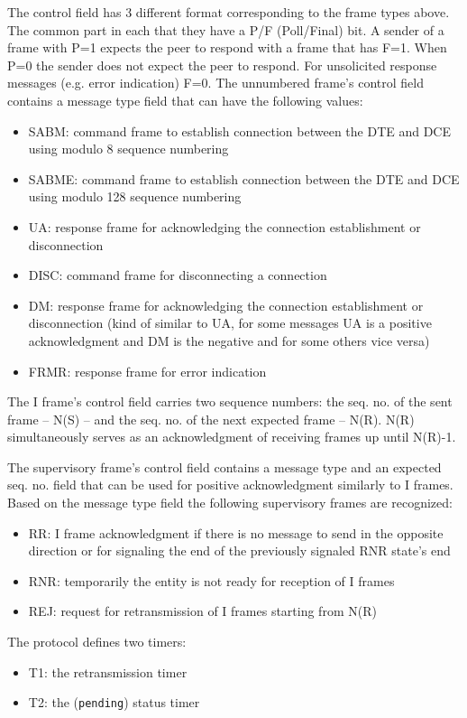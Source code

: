 \documentclass[a4paper]{article}
\begin{document}
The control field has 3 different format corresponding to the frame types above. The common part in each that they have a P/F (Poll/Final) bit. A sender of a frame with P=1 expects the peer to respond with a frame that has F=1. When P=0 the sender does not expect the peer to respond. For unsolicited response messages (e.g. error indication) F=0.
The unnumbered frame's control field contains a message type field that can have the following values:
\begin{itemize}
\item SABM: command frame to establish connection between the DTE and DCE using modulo 8 sequence numbering
\item SABME: command frame to establish connection between the DTE and DCE using modulo 128 sequence numbering
\item UA: response frame for acknowledging the connection establishment or disconnection
\item DISC: command frame for disconnecting a connection
\item DM: response frame for acknowledging the connection establishment or disconnection
  (kind of similar to UA, for some messages UA is a positive acknowledgment and DM is the negative and for some others vice versa)
\item FRMR: response frame for error indication
\end{itemize}

The I frame's control field carries two sequence numbers: the seq. no. of the sent frame -- N(S) -- and the seq. no. of the next expected frame -- N(R).
N(R) simultaneously serves as an acknowledgment of receiving frames up until N(R)-1.

The supervisory frame's control field contains a message type and an expected seq. no. field that can be used for positive acknowledgment similarly to I frames. Based on the message type field the following supervisory frames are recognized:
\begin{itemize}
\item RR: I frame acknowledgment if there is no message to send in the opposite direction or for signaling the end of the previously signaled RNR state's end
\item RNR: temporarily the entity is not ready for reception of I frames
\item REJ: request for retransmission of I frames starting from N(R)
\end{itemize}

The protocol defines two timers:
\begin{itemize}
\item T1: the retransmission timer
\item T2: the (\verb!pending!) status timer
\end{itemize}
\end{document}
